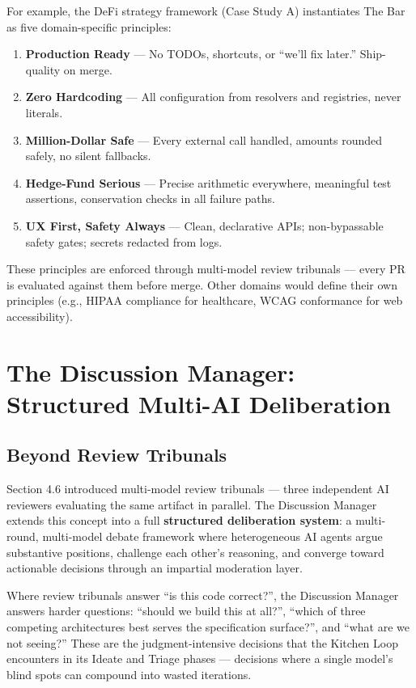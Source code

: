 \documentclass[11pt,a4paper]{article}
\begin{document}
For example, the DeFi strategy framework (Case Study A) instantiates The Bar as five domain-specific principles:

\begin{enumerate}[nosep]
\item \textbf{Production Ready} --- No TODOs, shortcuts, or ``we'll fix later.'' Ship-quality on merge.
\item \textbf{Zero Hardcoding} --- All configuration from resolvers and registries, never literals.
\item \textbf{Million-Dollar Safe} --- Every external call handled, amounts rounded safely, no silent fallbacks.
\item \textbf{Hedge-Fund Serious} --- Precise arithmetic everywhere, meaningful test assertions, conservation checks in all failure paths.
\item \textbf{UX First, Safety Always} --- Clean, declarative APIs; non-bypassable safety gates; secrets redacted from logs.
\end{enumerate}

\noindent These principles are enforced through multi-model review tribunals --- every PR is evaluated against them before merge. Other domains would define their own principles (e.g., HIPAA compliance for healthcare, WCAG conformance for web accessibility).


\section{The Discussion Manager: Structured Multi-AI Deliberation}\label{sec:discussion-manager-structured-multi-ai-deliberation}

\subsection{Beyond Review Tribunals}\label{sec:beyond-review-tribunals}

Section 4.6 introduced multi-model review tribunals --- three independent AI reviewers evaluating the same artifact in parallel. The Discussion Manager extends this concept into a full \textbf{structured deliberation system}: a multi-round, multi-model debate framework where heterogeneous AI agents argue substantive positions, challenge each other's reasoning, and converge toward actionable decisions through an impartial moderation layer.

Where review tribunals answer ``is this code correct?'', the Discussion Manager answers harder questions: ``should we build this at all?'', ``which of three competing architectures best serves the specification surface?'', and ``what are we not seeing?'' These are the judgment-intensive decisions that the Kitchen Loop encounters in its Ideate and Triage phases --- decisions where a single model's blind spots can compound into wasted iterations.
\end{document}
